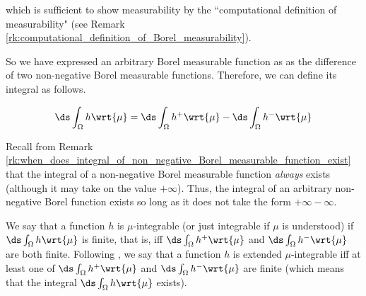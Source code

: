 \documentclass{article} %
\newcommand{\dint}{\ds\int}
\newcommand{\dmu}{\wrt{\mu}}
\begin{document}
which is sufficient to show measurability by the ``computational definition of measurability" (see Remark \ref{rk:computational_definition_of_Borel_measurability}). 

So we have expressed an arbitrary Borel measurable function as as the difference of two non-negative Borel measurable functions. Therefore, we can define its integral as follows.  

\begin{definition}{}
\begin{align} 
 \ds\int_\Omega h \wrt{\mu} = \ds\int_\Omega h^+ \wrt{\mu} - \ds\int_\Omega h^- \wrt{\mu} 
\label{eqn:definition_of_integral_of_arbitrary_borel_measurable_function}
\end{align}
\label{def:integral_of_arbitrary_borel_measurable_function}
\end{definition}




\begin{remark}{}
Recall from Remark \ref{rk:when_does_integral_of_non_negative_Borel_measurable_function_exist} that the integral of a non-negative Borel measurable function \textit{always} exists (although it may take on the value $+\infty$).  Thus, the integral of an arbitrary non-negative Borel function exists so long as it does not take the form $+\infty - \infty$. 
\label{rk:when_does_integral_of_arbitary_Borel_measurable_function_exist}
\end{remark}

\begin{definition}{}
We say that a function $h$ is $\mu$-integrable (or just integrable if $\mu$ is understood) if $
\ds\int_\Omega h \wrt{\mu}$ is finite, that is, iff $
\ds\int_\Omega h^+ \wrt{\mu}$ and $
\ds\int_\Omega h^- \wrt{\mu}$ are both finite.   %
Following \cite[pp.~86]{folland1999real}, we say that a function $h$ is extended $\mu$-integrable iff at least one of $
\ds\int_\Omega h^+ \wrt{\mu}$ and $
\ds\int_\Omega h^- \wrt{\mu}$ are finite (which means that the integral $\ds\int_\Omega h \wrt{\mu}$ exists).
\label{def:integrable_and_extended_integrable_functions}
\end{definition}
\end{document}
